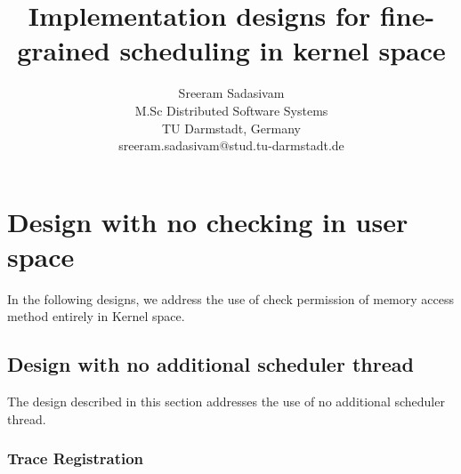 \documentclass[11pt]{article}
\begin{document}
\title{\vspace{-3.5cm} Implementation designs for fine-grained scheduling in kernel space}


\author{
		 Sreeram Sadasivam\\
		M.Sc Distributed Software Systems\\
		TU Darmstadt, Germany\\
		sreeram.sadasivam@stud.tu-darmstadt.de
}

\date{}


\maketitle

\section*{Design with no checking in user space}

In the following designs, we address the use of check permission of memory access method entirely in Kernel space.

\subsection*{Design with no additional scheduler thread}

The design described in this section addresses the use of no additional scheduler thread. 


\subsubsection*{Trace Registration}
\end{document}
